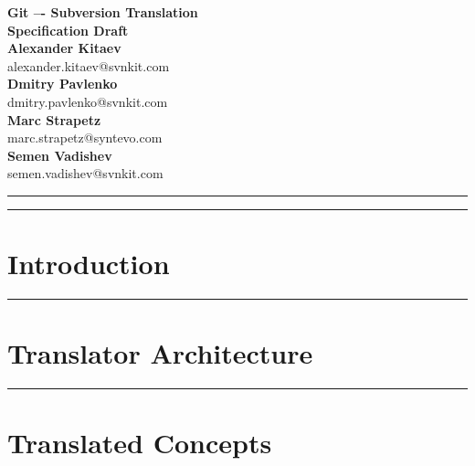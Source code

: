 \documentclass[aps,%
12pt,%
final,%
oneside,
onecolumn,%
superscriptaddress,%
centertags]{article} %
\begin{document}
\begin{titlepage}
\begin{center}

\textbf{\LARGE Git –- Subversion Translation} \\[2.0cm]
\textbf{\Large Specification Draft} \\[3.0cm]

\textbf{Alexander Kitaev} \\[0.2cm]
\textnormal{alexander.kitaev@svnkit.com} \\[1.0cm]

\textbf{Dmitry Pavlenko} \\[0.2cm]
\textnormal{dmitry.pavlenko@svnkit.com} \\[1.0cm]

\textbf{Marc Strapetz} \\[0.2cm]
\textnormal{marc.strapetz@syntevo.com} \\[1.0cm]

\textbf{Semen Vadishev} \\[0.2cm]
\textnormal{semen.vadishev@svnkit.com} \\[1.0cm]

\end{center}
\end{titlepage}

\topmargin=-10pt
\setcounter{page}{2}

\newpage
\hrule
\tableofcontents

\newpage
\hrule
\section{Introduction}


\newpage
\hrule
\section{Translator Architecture}






\newpage
\hrule
\section{Translated Concepts}






\end{document}
